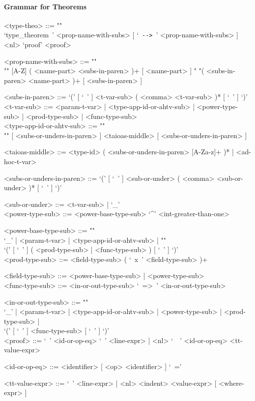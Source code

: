 \documentclass[diploma]{softlab-thesis}
\begin{document}
\newpage

\paragraph{Grammar for Theorems}

\begin{grammar}
<type-theo> ::= ""\\
`type_theorem\ ' <prop-name-with-subs>
[ `\ \verb|-->|\ ' <prop-name-with-subs> ] <nl>
`proof' <proof>

<prop-name-with-subs> ::=  ""\\""
[A-Z] ( <name-part> <subs-in-paren> )+ [ <name-part> ]
\alt " "( <subs-in-paren> <name-part> )+ [ <subs-in-paren> ]

<subs-in-paren> ::=
`(' [ `\ ' ] <t-var-sub> ( <comma> <t-var-sub> )* [ `\ ' ] `)'
\\

<t-var-sub> ::=
<param-t-var> | <type-app-id-or-ahtv-sub> | <power-type-sub> | <prod-type-sub> |
<func-type-sub>
\\

<type-app-id-or-ahtv-sub> ::= ""\\""
[ <subs-or-unders-in-paren> ] <taioas-middle> [ <subs-or-unders-in-paren> ]

<taioas-middle> ::=
<type-id> ( <subs-or-unders-in-paren> [A-Za-z]+ )* | <ad-hoc-t-var>

<subs-or-unders-in-paren> ::=
`(' [ `\ ' ] <sub-or-under> ( <comma> <sub-or-under> )* [ `\ ' ] `)'

<sub-or-under> ::= <t-var-sub> | `_'
\\

<power-type-sub> ::= <power-base-type-sub> `^' <int-greater-than-one>

<power-base-type-sub> ::= ""\\
`_' | <param-t-var> | <type-app-id-or-ahtv-sub> | ""\\
`(' [ `\ ' ] ( <prod-type-sub> | <func-type-sub> ) [ `\ ' ] `)'
\\

<prod-type-sub> ::= <field-type-sub> ( `\ x\ ' <field-type-sub> )+

<field-type-sub> ::= <power-base-type-sub> | <power-type-sub>
\\

<func-type-sub> ::= <in-or-out-type-sub> `\ =>\ ' <in-or-out-type-sub>

<in-or-out-type-sub> ::= ""\\
`_' | <param-t-var> | <type-app-id-or-ahtv-sub> | <power-type-sub> |
<prod-type-sub> | \\`(' [ `\ ' ] <func-type-sub> [ `\ ' ] `)'
\\

<proof> ::=
`\ ' <id-or-op-eq> `\ ' <line-expr> |
<nl> `\ \ ' <id-or-op-eq>  <tt-value-expr>

<id-or-op-eq> ::= <identifier> [ <op> <identifier> ] `\ ='

<tt-value-expr> ::=
`\ ' <line-expr> | <nl> <indent> <value-expr> [ <where-expr> ]
\end{grammar}
\end{document}
